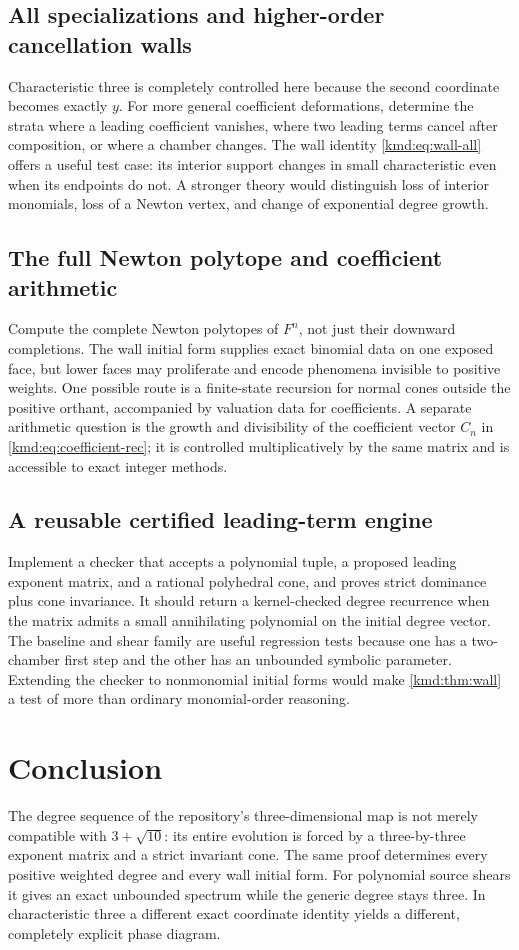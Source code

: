 \documentclass[11pt,a4paper]{article}
\numberwithin{equation}{section}
\theoremstyle{definition}
\theoremstyle{remark}
\begin{document}
\subsection{All specializations and higher-order cancellation walls}
Characteristic three is completely controlled here because the
second coordinate becomes exactly $y$. For more general
coefficient deformations, determine the strata where a leading
coefficient vanishes, where two leading terms cancel after
composition, or where a chamber changes. The wall identity
\eqref{kmd:eq:wall-all} offers a useful test case: its interior support
changes in small characteristic even when its endpoints do not.
A stronger theory would distinguish loss of interior monomials,
loss of a Newton vertex, and change of exponential degree growth.

\subsection{The full Newton polytope and coefficient arithmetic}
Compute the complete Newton polytopes of $F^n$, not just their
downward completions. The wall initial form supplies exact
binomial data on one exposed face, but lower faces may proliferate
and encode phenomena invisible to positive weights. One possible
route is a finite-state recursion for normal cones outside the
positive orthant, accompanied by valuation data for coefficients.
A separate arithmetic question is the growth and divisibility of
the coefficient vector $C_n$ in \eqref{kmd:eq:coefficient-rec}; it is
controlled multiplicatively by the same matrix and is accessible
to exact integer methods.

\subsection{A reusable certified leading-term engine}
Implement a checker that accepts a polynomial tuple, a proposed
leading exponent matrix, and a rational polyhedral cone, and
proves strict dominance plus cone invariance. It should return a
kernel-checked degree recurrence when the matrix admits a small
annihilating polynomial on the initial degree vector. The
baseline and shear family are useful regression tests because
one has a two-chamber first step and the other has an unbounded
symbolic parameter. Extending the checker to nonmonomial initial
forms would make \cref{kmd:thm:wall} a test of more than ordinary
monomial-order reasoning.

\section{Conclusion}
The degree sequence of the repository's three-dimensional map is
not merely compatible with $3+\sqrt{10}$: its entire evolution is
forced by a three-by-three exponent matrix and a strict invariant
cone. The same proof determines every positive weighted degree
and every wall initial form. For polynomial source shears it
gives an exact unbounded spectrum while the generic degree stays
three. In characteristic three a different exact coordinate
identity yields a different, completely explicit phase diagram.
\end{document}

